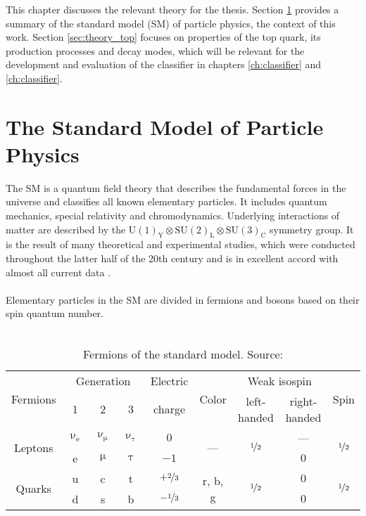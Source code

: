 This chapter discusses the relevant theory for the thesis. Section \ref{sec:theory_sm} provides a summary of the standard model (SM) of particle physics, the context of this work. Section \ref{sec:theory_top} focuses on properties of the top quark, its production processes and decay modes, which will be relevant for the development and evaluation of the classifier in chapters \ref{ch:classifier} and \ref{ch:classifier}.
\section{The Standard Model of Particle Physics}
\label{sec:theory_sm}
The SM is a quantum field theory that describes the fundamental forces in the universe and classifies all known elementary particles. It includes quantum mechanics, special relativity and chromodynamics. Underlying interactions of matter are described by the $\textrm{U}(1)_\textrm{Y}\otimes \textrm{SU}(2)_\textrm{L}\otimes \textrm{SU}(3)_\textrm{C}$ symmetry group. It is the result of many theoretical and experimental studies, which were conducted throughout the latter half of the 20th century and is in excellent accord with almost all current data \cite{RevModPhys.71.S96}.\\ \\
Elementary particles in the SM are divided in fermions and bosons based on their spin quantum number.\\ \\
\begin{table}[h]
\caption[Fermions of the SM]{Fermions of the standard model. Source: \cite{povh}}
\label{tab:ch_1_sm_particles}
\begin{tabular}{ccccccccc}
\toprule
\multirow{2}{*}{Fermions} & \multicolumn{3}{c}{Generation} & {Electric} & \multirow{2}{*}{Color} & \multicolumn{2}{c}{Weak isospin} & \multirow{2}{*}{Spin}\\
& 1 & 2 & 3 & {charge} & & left-handed & right-handed & \\
\midrule
\multirow{2}{*}{Leptons} & $\upnu_\textrm{e}$ & $\upnu_\upmu$ & $\upnu_\uptau$ & {$0$} & \multirow{2}{*}{---} & \multirow{2}{*}{$\nicefrac{1}{2}$} & --- & \multirow{2}{*}{$\nicefrac{1}{2}$}\\
& e & $\upmu$ & $\uptau$ & {$-1$} & & & {$0$} &\\
\midrule
\multirow{2}{*}{Quarks} & u & c & t & $+\nicefrac{2}{3}$ & \multirow{2}{*}{r, b, g} & \multirow{2}{*}{$\nicefrac{1}{2}$} & {$0$} & \multirow{2}{*}{$\nicefrac{1}{2}$}\\
& d & s & b & $-\nicefrac{1}{3}$ & & & {$0$} & \\
\bottomrule
\end{tabular}
\end{table}


